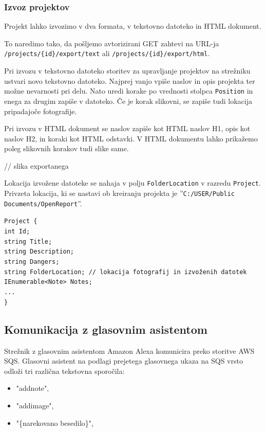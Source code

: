 \documentclass[a4paper, 12pt]{book}
\begin{document}
\subsubsection{Izvoz projektov}

Projekt lahko izvozimo v dva formata, v tekstovno datoteko in HTML dokument.

To naredimo tako, da pošljemo avtorizirani GET zahtevi na URL-ja \texttt{/projects/\{id\}/export/text} ali \texttt{/projects/\{id\}/export/html}.

Pri izvozu v tekstovno datoteko storitev za upravljanje projektov na strežniku ustvari novo tekstovno datoteko.
Najprej vanjo vpiše naslov in opis projekta ter možne nevarnosti pri delu.
Nato uredi korake po vrednosti stolpca \texttt{Position} in enega za drugim zapiše v datoteko.
Če je korak slikovni, se zapiše tudi lokacija pripadajoče fotografije.

Pri izvozu v HTML dokument se naslov zapiše kot HTML naslov H1, opis kot naslov H2, in koraki kot HTML odstavki.
V HTML dokumentu lahko prikažemo poleg slikovnih korakov tudi slike same.

// slika exportanega 

Lokacija izvožene datoteke se nahaja v polju \texttt{FolderLocation} v razredu \texttt{Project}.
Privzeta lokacija, ki se nastavi ob kreiranju projekta je ''\texttt{C:/USER/Public Documents/OpenReport}''.

\noindent \texttt{Project \{ \\
int Id; \\
string Title; \\
string Description; \\
string Dangers; \\
string FolderLocation; // lokacija fotografij in izvoženih datotek \\
IEnumerable<Note> Notes; \\
... \\
\}
}

\subsection{Komunikacija z glasovnim asistentom}

Strežnik z glasovnim asistentom Amazon Alexa komunicira preko storitve AWS SQS.
Glasovni asistent na podlagi prejetega glasovnega ukaza na SQS vrsto odloži tri različna tekstovna sporočila:
\begin{itemize}
	\item "addnote",
	\item "addimage",
	\item "\{narekovano besedilo\}",
\end{itemize}
\end{document}
